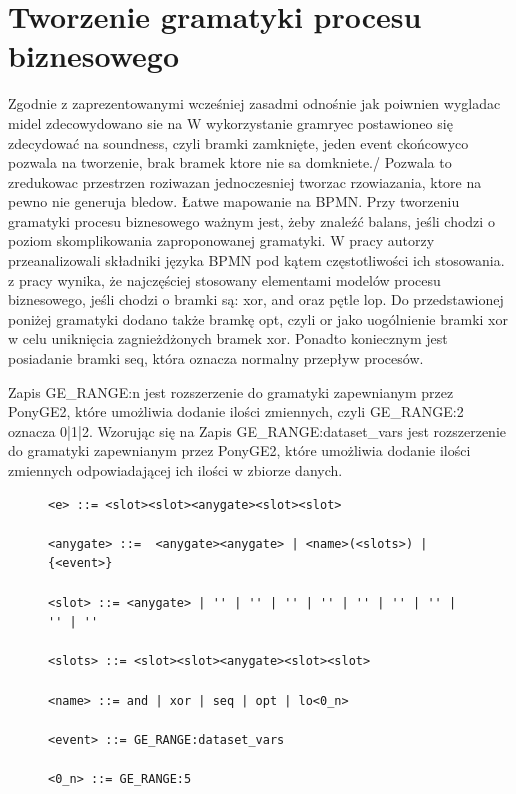 \section{Tworzenie gramatyki procesu biznesowego}

Zgodnie z zaprezentowanymi wcześniej zasadmi odnośnie jak poiwnien wygladac midel zdecowydowano sie na W wykorzystanie gramryec postawioneo się zdecydować na soundness, czyli bramki zamknięte, jeden event ckońcowyco pozwala na tworzenie, brak bramek ktore nie sa domkniete./ Pozwala to zredukowac przestrzen roziwazan jednoczesniej tworzac rzowiazania, ktore na pewno nie generuja bledow. 
Łatwe mapowanie na BPMN.
Przy tworzeniu gramatyki procesu biznesowego ważnym jest, żeby znaleźć balans, jeśli chodzi o poziom skomplikowania zaproponowanej
gramatyki.  W pracy \cite{10.1007/978-3-540-69534-9_35} autorzy przeanalizowali składniki języka BPMN pod kątem częstotliwości ich stosowania. z pracy wynika, że najczęściej stosowany elementami modelów procesu biznesowego, jeśli chodzi o bramki są: xor, and oraz pętle lop. Do przedstawionej poniżej gramatyki dodano także bramkę opt, czyli or jako uogólnienie bramki xor w celu uniknięcia zagnieżdżonych bramek xor. Ponadto koniecznym jest posiadanie bramki seq, która oznacza normalny przepływ procesów.

Zapis GE{\_}RANGE:n jest rozszerzenie do gramatyki zapewnianym przez PonyGE2, które umożliwia dodanie ilości zmiennych, czyli GE{\_}RANGE:2 oznacza 0|1|2.
Wzorując się na  Zapis GE{\_}RANGE:dataset{\_}vars jest rozszerzenie do gramatyki zapewnianym przez PonyGE2, które umożliwia dodanie ilości zmiennych odpowiadającej ich ilości w zbiorze danych.

\begin{figure}[!ht]
\lstset{caption=Gramatyka procesu biznesowego, captionpos=b}
\lstset{label=src:grammar, frame=single}
\begin{lstlisting}
<e> ::= <slot><slot><anygate><slot><slot>

<anygate> ::=  <anygate><anygate> | <name>(<slots>) | {<event>}

<slot> ::= <anygate> | '' | '' | '' | '' | '' | '' | '' | '' | ''

<slots> ::= <slot><slot><anygate><slot><slot>

<name> ::= and | xor | seq | opt | lo<0_n>

<event> ::= GE_RANGE:dataset_vars

<0_n> ::= GE_RANGE:5
\end{lstlisting}
\end{figure}

